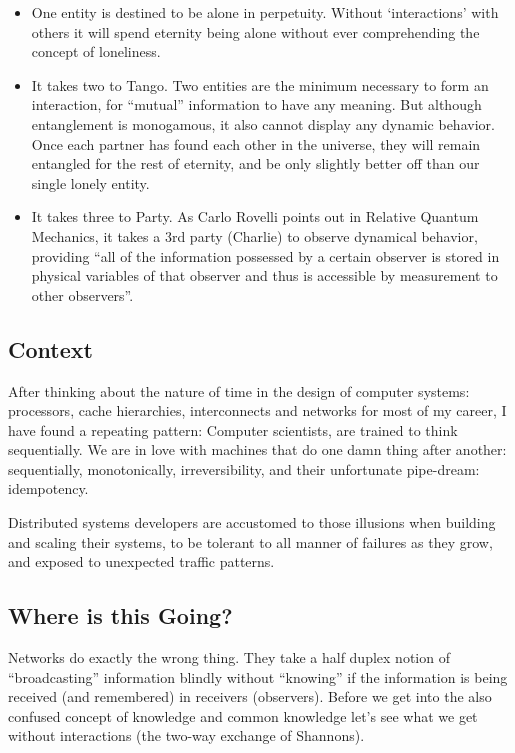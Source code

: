 \begin{itemize}
  \item One entity is destined to be alone in perpetuity. Without ‘interactions' with others it will spend eternity being alone without ever comprehending the concept of loneliness.
  \item It takes two to Tango. Two entities are the minimum necessary to form an interaction, for “mutual” information to have any meaning. But although entanglement is monogamous, it also cannot display any dynamic behavior. Once each partner has found each other in the universe, they will remain entangled for the rest of eternity, and be only slightly better off than our single lonely entity.
  \item It takes three to Party. As Carlo Rovelli points out in Relative Quantum Mechanics, it takes a 3rd party (Charlie) to observe dynamical behavior, providing “all of the information possessed by a certain observer is stored in physical variables of that observer and thus is accessible by measurement to other observers”.
\end{itemize}

\subsection{Context}
After thinking about the nature of time in the design of computer systems: processors, cache hierarchies, interconnects and networks for most of my career, I have found a repeating pattern: Computer scientists, are trained to think sequentially. We are in love with machines that do one damn thing after another: sequentially, monotonically, irreversibility, and their unfortunate pipe-dream: idempotency. 

Distributed systems developers are accustomed to  those illusions when building and scaling their systems, to be tolerant to all manner of failures as they grow, and exposed to unexpected traffic patterns.

\subsection{Where is this Going?}
Networks do exactly the wrong thing. They take a half duplex notion of “broadcasting” information blindly without “knowing” if the information is being received (and remembered) in receivers (observers).  Before we get into the also confused concept of knowledge and common knowledge let’s see what we get without interactions (the two-way exchange of Shannons).

